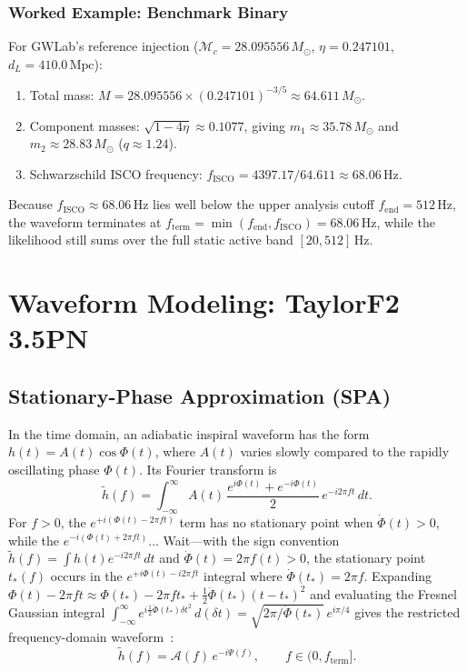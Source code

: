 \documentclass[11pt,a4paper]{report}
\begin{document}
\subsection{Worked Example: Benchmark Binary}
For GWLab's reference injection ($\mathcal{M}_c = 28.095556\,M_\odot$, $\eta = 0.247101$, $d_L = 410.0\,\mathrm{Mpc}$):
\begin{enumerate}[leftmargin=1.5em]
    \item Total mass: $M = 28.095556 \times (0.247101)^{-3/5} \approx 64.611\,M_\odot$.
    \item Component masses: $\sqrt{1 - 4\eta} \approx 0.1077$, giving $m_1 \approx 35.78\,M_\odot$ and $m_2 \approx 28.83\,M_\odot$ ($q \approx 1.24$).
    \item Schwarzschild ISCO frequency: $f_{\mathrm{ISCO}} = 4397.17 / 64.611 \approx 68.06\,\mathrm{Hz}$.
\end{enumerate}
Because $f_{\mathrm{ISCO}} \approx 68.06\,\mathrm{Hz}$ lies well below the upper analysis cutoff $f_{\mathrm{end}} = 512\,\mathrm{Hz}$, the waveform terminates at $f_{\mathrm{term}} = \min(f_{\mathrm{end}}, f_{\mathrm{ISCO}}) = 68.06\,\mathrm{Hz}$, while the likelihood still sums over the full static active band $[20, 512]\,\mathrm{Hz}$.

\chapter{Waveform Modeling: TaylorF2 3.5PN}

\section{Stationary-Phase Approximation (SPA)}
In the time domain, an adiabatic inspiral waveform has the form $h(t) = A(t)\cos\Phi(t)$, where $A(t)$ varies slowly compared to the rapidly oscillating phase $\Phi(t)$. Its Fourier transform is
\begin{equation}
\tilde{h}(f) = \int_{-\infty}^{\infty} A(t)\,\frac{e^{i\Phi(t)} + e^{-i\Phi(t)}}{2}\,e^{-i2\pi f t}\,dt.
\end{equation}
For $f > 0$, the $e^{+i(\Phi(t) - 2\pi f t)}$ term has no stationary point when $\dot{\Phi}(t) > 0$, while the $e^{-i(\Phi(t) + 2\pi f t)}$... Wait—with the sign convention $\tilde{h}(f) = \int h(t) e^{-i2\pi f t}\,dt$ and $\dot{\Phi}(t) = 2\pi f(t) > 0$, the stationary point $t_*(f)$ occurs in the $e^{+i\Phi(t) - i2\pi f t}$ integral where $\dot{\Phi}(t_*) = 2\pi f$. Expanding $\Phi(t) - 2\pi f t \approx \Phi(t_*) - 2\pi f t_* + \frac{1}{2}\ddot{\Phi}(t_*)(t - t_*)^2$ and evaluating the Fresnel Gaussian integral $\int_{-\infty}^{\infty} e^{i \frac{1}{2}\ddot{\Phi}(t_*)\delta t^2}\,d(\delta t) = \sqrt{2\pi / \ddot{\Phi}(t_*)}\,e^{i\pi/4}$ gives the restricted frequency-domain waveform~\cite{SathyaprakashDhurandhar1991,Buonanno2009}:
\begin{equation}
\tilde{h}(f) = \mathcal{A}(f)\,e^{-i\Psi(f)}, \qquad f \in (0, f_{\mathrm{term}}].
\end{equation}
\end{document}
